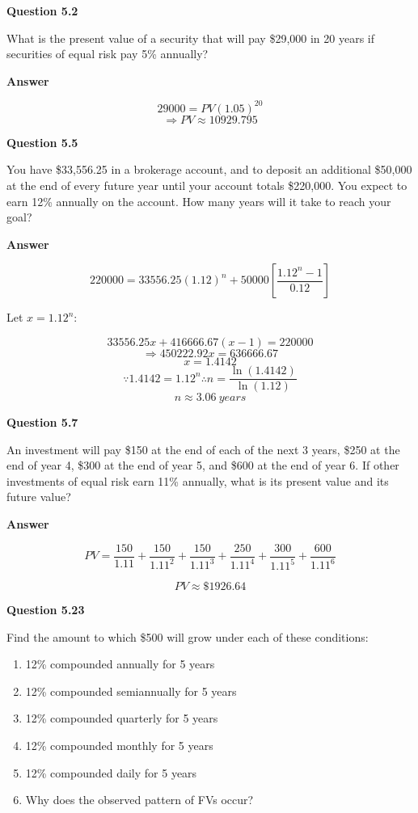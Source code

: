 \documentclass[11pt]{article}
\begin{document}
\textbf{Question 5.2}
\bigskip

What is the present value of a security that will pay \$29,000 in 20 years if securities of equal risk pay 5\% annually?

\bigskip
\textbf{Answer}

\[
  29000 = PV(1.05)^{20}
\]
\[
  \Rightarrow \boxed {PV \approx 10929.795}
\]

\bigskip
\bigskip
\textbf{Question 5.5}
\bigskip

You have \$33,556.25 in a brokerage account, and to deposit an additional \$50,000 at the end of every future year until your account totals \$220,000.
You expect to earn 12\% annually on the account. How many years will it take to reach your goal?

\bigskip
\textbf{Answer}

\[
  220000 = 33556.25(1.12)^n + 50000[\frac{1.12^n - 1}{0.12}]
\]

Let $x=1.12^n$:

\[
  33556.25x+416666.67(x - 1)=220000
\]
\[
  \Rightarrow 450222.92x=636666.67
\]
\[
  x=1.4142
\]
\[
  \because 1.4142 = 1.12^n \therefore n = \frac{\ln(1.4142)}{\ln(1.12)}
\]
\[
  \boxed{n \approx 3.06 \ years}
\]

\bigskip
\bigskip
\textbf{Question 5.7}
\bigskip

An investment will pay \$150 at the end of each of the next 3 years, \$250 at the end of year 4, \$300 at the end of year 5, and \$600 at the end of year 6. 
If other investments of equal risk earn 11\% annually, what is its present value and its future value?

\bigskip
\textbf{Answer}

\[
  PV = \frac {150}{1.11} + \frac {150}{1.11^2} + \frac {150}{1.11^3} + \frac {250}{1.11^4} + \frac {300}{1.11^5} + \frac {600}{1.11^6}
\]

\[
  \boxed{PV \approx \$1926.64}
\]

\bigskip
\bigskip
\textbf{Question 5.23}
\bigskip

Find the amount to which \$500 will grow under each of these conditions:

\begin{enumerate}
  \item[a.] 12\% compounded annually for 5 years
  \item[b.] 12\% compounded semiannually for 5 years
  \item[c.] 12\% compounded quarterly for 5 years
  \item[d.] 12\% compounded monthly for 5 years
  \item[e.] 12\% compounded daily for 5 years
  \item[f.] Why does the observed pattern of FVs occur? 
\end{enumerate}
\end{document}
